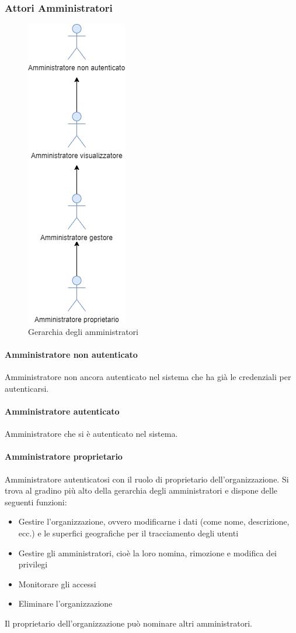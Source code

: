 \subsubsection{Attori Amministratori}
\begin{figure}[h]
  \caption{Gerarchia degli amministratori}
  \centering
    \includegraphics[scale=0.6]{sezioni/UseCase/Immagini/Amministratori.png}
\end{figure}


\paragraph{Amministratore non autenticato}
Amministratore non ancora autenticato nel sistema che ha già le credenziali per autenticarsi.
\paragraph{Amministratore autenticato}
Amministratore che si è autenticato nel sistema.
\paragraph{Amministratore proprietario}
Amministratore autenticatosi con il ruolo di proprietario dell'organizzazione.
Si trova al gradino più alto della gerarchia degli amministratori e dispone delle seguenti funzioni:
\begin{itemize}
\item Gestire l'organizzazione, ovvero modificarne i dati (come nome, descrizione, ecc.) e le superfici geografiche per il tracciamento degli utenti
\item Gestire gli amministratori, cioè la loro nomina, rimozione e modifica dei privilegi
\item Monitorare gli accessi
\item Eliminare l'organizzazione
\end{itemize}
Il proprietario dell'organizzazione può nominare altri amministratori.
